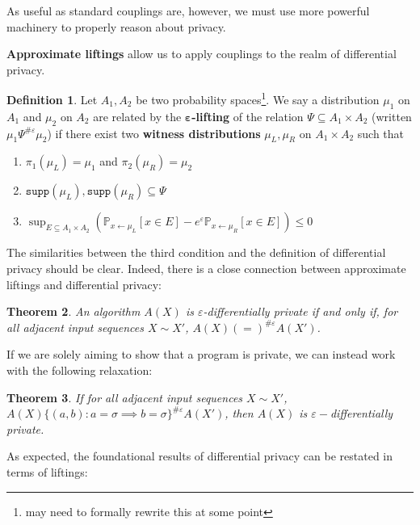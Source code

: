 \documentclass[12pt]{article}
\newcommand{\PP}{\mathbb{P}}
\newcommand{\supp}{\texttt{supp}}
\newtheorem{thm}{Theorem}[section]
\theoremstyle{definition}
\newtheorem{defn}[thm]{Definition}
\begin{document}
As useful as standard couplings are, however, we must use more powerful machinery to properly reason about privacy.

\textbf{Approximate liftings} \cite{BartheOlmedo2013,bartheKopfOlmedo2012ProbabilisticRelationalReasoningforDifferentialPriv,HsuThesis2017,BartheEtAl2016} allow us to apply couplings to the realm of differential privacy. 

\begin{defn}
    Let $A_1, A_2$ be two probability spaces\footnote{may need to formally rewrite this at some point}. We say a distribution $\mu_1$ on $A_1$ and $\mu_2$ on $A_2$ are related by the $\mathbf{\varepsilon}$\textbf{-lifting} of the relation $\Psi\subseteq A_1\times A_2$ (written $\mu_1\Psi^{\#\varepsilon}\mu_2$) if there exist two \textbf{witness distributions} $\mu_L, \mu_R$ on $A_1\times A_2$ such that\begin{enumerate}
        \item $\pi_1(\mu_L) = \mu_1$ and $\pi_2(\mu_R) = \mu_2$
        \item $\supp(\mu_L), \supp(\mu_R)\subseteq \Psi$
        \item $\sup_{E\subseteq A_1\times A_2}(\PP_{x\gets \mu_L}[x\in E]- e^\varepsilon \PP_{x\gets \mu_R}[x\in E])\leq 0$
    \end{enumerate}
\end{defn}

The similarities between the third condition and the definition of differential privacy should be clear. Indeed, there is a close connection between approximate liftings and differential privacy:

\begin{thm}
    An algorithm $A(X)$ is $\varepsilon$-differentially private if and only if, for all adjacent input sequences $X\sim X'$, $A(X)(=)^{\#\varepsilon}A(X')$.
\end{thm}

If we are solely aiming to show that a program is private, we can instead work with the following relaxation: 

\begin{thm}\label{implicationcouplingthm}
    If for all adjacent input sequences $X\sim X'$, $A(X)\{(a, b): a=\sigma\implies b=\sigma\}^{\#\varepsilon}A(X')$, then $A(X)$ is $\varepsilon-$differentially private.
\end{thm}

As expected, the foundational results of differential privacy can be restated in terms of liftings:
\end{document}
